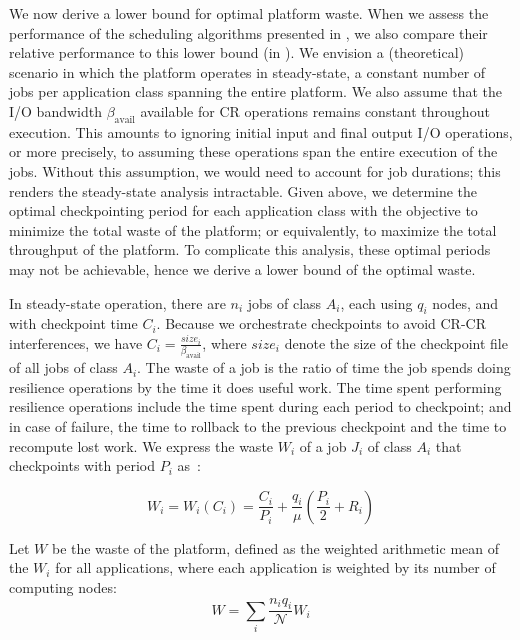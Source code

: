 \documentclass[conference,nofonttune]{IEEEtran}
\newcommand{\bandavail}{\beta_{\text{avail}}}
\newcommand{\nbnodesplat}{{\mathcal N}}
\newcommand{\app}[1]{A_{#1}}
\newcommand{\nbapp}[1]{n_{#1}}
\newcommand{\nbnodes}[1]{q_{#1}}
\newcommand{\period}[1]{P_{#1}}
\newcommand{\ckpt}[1]{C_{#1}}
\newcommand{\reco}[1]{R_{#1}}
\newcommand{\size}[1]{\mathit{size}_{#1}}
\newcommand{\wasteapp}[1]{W_{#1}}
\newcommand{\mtbfplat}{\mu}
\newcommand{\wasteplat}{W}
\newcommand{\wastefct}[2]{W_{#1}(#2)}
\begin{document}
We now derive a lower bound for optimal platform waste.  When we assess the
performance of the scheduling algorithms presented in , we
also compare their relative performance to this lower bound (in
).
We envision a (theoretical) scenario in which the platform operates in
steady-state, a constant number of jobs per application class spanning the
entire platform.  We also assume that the I/O bandwidth $\bandavail$ available
for CR operations remains constant throughout execution. This amounts to
ignoring initial input and final output I/O operations, or more precisely, to
assuming these operations span the entire execution of the jobs.  Without this
assumption, we would need to account for job durations; this renders the
steady-state analysis intractable.  Given above, we determine the optimal
checkpointing period for each application class with the objective to minimize
the total waste of the platform; or equivalently, to maximize the total
throughput of the platform. To complicate this analysis, these optimal periods
may not be achievable, hence we derive a lower bound of the optimal waste.

In steady-state operation, there are $\nbapp{i}$ jobs of class $\app{i}$, each
using $\nbnodes{i}$ nodes, and with checkpoint time $\ckpt{i}$. Because we
orchestrate checkpoints to avoid CR-CR interferences, we have $\ckpt{i} =
\frac{\size{i}}{\bandavail}$, where $\size{i}$ denote the size of the
checkpoint file of all jobs of class $\app{i}$.  The waste of a job is the
ratio of time the job spends doing resilience operations by the time it does
useful work. The time spent performing resilience operations include the time spent
during each period to checkpoint; and in case of failure, the time to rollback
to the previous checkpoint and the time to recompute lost work.
We express the waste $\wasteapp{i}$ of a job $J_{i}$ of class $\app{i}$
that checkpoints with period $\period{i}$ as~\cite{springer-monograph}:

\begin{equation}
\wasteapp{i} = \wastefct{i}{\ckpt{i}} = \frac{\ckpt{i}}{\period{i}} +
\frac{\nbnodes{i}}{\mtbfplat}(\frac{\period{i}}{2} + \reco{i})
\label{eq.wasteAi}
\end{equation}

Let $\wasteplat$ be the waste of the platform, defined as the
weighted arithmetic mean of the $\wasteapp{i}$ for all applications,
where each application is weighted by its number of computing nodes:
\begin{equation}
\wasteplat = \sum_i \frac{\nbapp{i} \nbnodes{i}}{\nbnodesplat} \wasteapp{i}
\label{eq.waste}
\end{equation}
\end{document}
